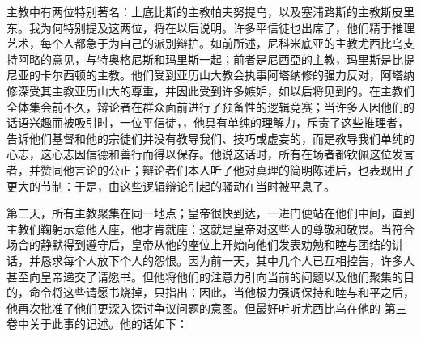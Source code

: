 主教中有两位特别著名：上底比斯的主教帕夫努提乌，以及塞浦路斯的主教斯皮里东。我为何特别提及这两位，将在以后说明。许多平信徒也出席了，他们精于推理艺术，每个人都急于为自己的派别辩护。如前所述，尼科米底亚的主教尤西比乌支持阿略的意见，与特奥格尼斯和玛里斯一起；前者是尼西亞的主教，玛里斯是比提尼亚的卡尔西顿的主教。他们受到亚历山大教会执事阿塔纳修的强力反对，阿塔纳修深受其主教亚历山大的尊重，并因此受到许多嫉妒，如以后将见到的。在主教们全体集会前不久，辩论者在群众面前进行了预备性的逻辑竞赛；当许多人因他们的话语兴趣而被吸引时，一位平信徒，，他具有单纯的理解力，斥责了这些推理者，告诉他们基督和他的宗徒们并没有教导我们、技巧或虚妄的，而是教导我们单纯的心志，这心志因信德和善行而得以保存。他说这话时，所有在场者都钦佩这位发言者，并赞同他言论的公正；辩论者们本人听了他对真理的简明陈述后，也表现出了更大的节制：于是，由这些逻辑辩论引起的骚动在当时被平息了。\par

第二天，所有主教聚集在同一地点；皇帝很快到达，一进门便站在他们中间，直到主教们鞠躬示意他入座，他才肯就座：这就是皇帝对这些人的尊敬和敬畏。当符合场合的静默得到遵守后，皇帝从他的座位上开始向他们发表劝勉和睦与团结的讲话，并恳求每个人放下个人的怨恨。因为前一天，其中几个人已互相控告，许多人甚至向皇帝递交了请愿书。但他将他们的注意力引向当前的问题以及他们聚集的目的，命令将这些请愿书烧掉，只指出：因此，当他极力强调保持和睦与和平之后，他再次批准了他们更深入探讨争议问题的意图。但最好听听尤西比乌在他的  第三卷中关于此事的记述。他的话如下：\par

\par

